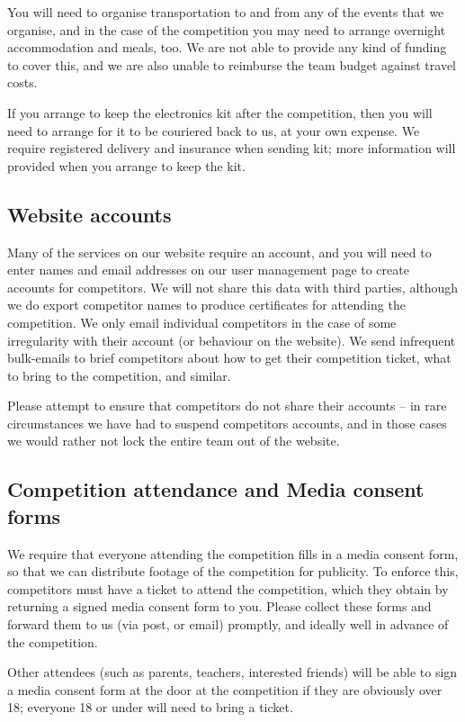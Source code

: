 \documentclass[a4paper]{article}
\begin{document}
You will need to organise transportation to and from any of the events that we
organise, and in the case of the competition you may need to arrange overnight
accommodation and meals, too. We are not able to provide any kind of funding to
cover this, and we are also unable to reimburse the team budget against travel
costs.

If you arrange to keep the electronics kit after the competition, then you will
need to arrange for it to be couriered back to us, at your own expense. We
require registered delivery and insurance when sending kit; more information
will provided when you arrange to keep the kit.

\subsection*{Website accounts}

Many of the services on our website require an account, and you will need to
enter names and email addresses on our user management page to create accounts
for competitors. We will not share this data with third parties, although we do
export competitor names to produce certificates for attending the competition.
We only email individual competitors in the case of some irregularity with
their account (or behaviour on the website). We send infrequent bulk-emails
to brief competitors about how to get their competition ticket, what to bring
to the competition, and similar.

Please attempt to ensure that competitors do not share their accounts -- in rare
circumstances we have had to suspend competitors accounts, and in those cases
we would rather not lock the entire team out of the website.

\subsection*{Competition attendance and Media consent forms}
 
We require that everyone attending the competition fills in a media consent
form, so that we can distribute footage of the competition for publicity.
To enforce this, competitors must have a ticket to attend the competition,
which they obtain by returning a signed media consent form to you. Please
collect these forms and forward them to us (via post, or email) promptly,
and ideally well in advance of the competition.

Other attendees (such as parents, teachers, interested friends) will be able
to sign a media consent form at the door at the competition if they are
obviously over 18; everyone 18 or under will need to bring a ticket.
\end{document}

